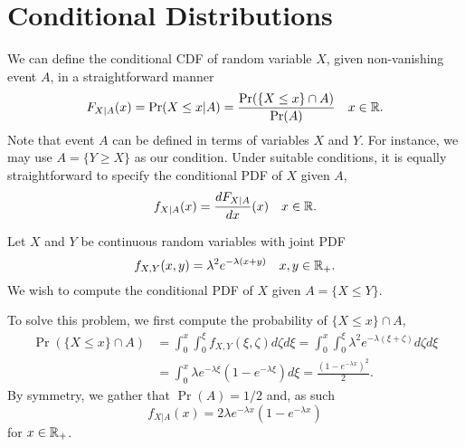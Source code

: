 \section{Conditional Distributions}

We can define the conditional CDF of random variable $X$, given non-vanishing event $A$, in a straightforward manner
\begin{equation*}
F_{X|A} (x) = \Pr (X \leq x | A)
= \frac{ \Pr ( \{ X \leq x \} \cap A ) }{\Pr(A)} \quad x \in \mathbb{R} .
\end{equation*}
Note that event $A$ can be defined in terms of variables $X$ and $Y$.
For instance, we may use $A = \{ Y \geq X \}$ as our condition.
Under suitable conditions, it is equally straightforward to specify the conditional PDF of $X$ given $A$,
\begin{equation*}
f_{X|A} (x) = \frac{d F_{X|A}}{dx} (x) \quad x \in \mathbb{R} .
\end{equation*}

\begin{example}
Let $X$ and $Y$ be continuous random variables with joint PDF
\begin{equation*}
f_{X,Y} (x,y) = \lambda^2 e^{-\lambda (x + y)} \quad x,y \in \mathbb{R}_+ .
\end{equation*}
We wish to compute the conditional PDF of $X$ given $A = \{ X \leq Y \}$.

To solve this problem, we first compute the probability of $\{ X \leq x \} \cap A$,
\begin{equation*}
\begin{split}
\Pr ( \{ X \leq x \} \cap A )
&= \int_0^x \int_0^{\xi} f_{X,Y} (\xi, \zeta) d\zeta d\xi
= \int_0^x \int_0^{\xi} \lambda^2 e^{-\lambda (\xi + \zeta)} d\zeta d\xi \\
&= \int_0^x \lambda e^{- \lambda \xi} \left( 1 - e^{- \lambda \xi} \right) d\xi
= \frac{ \left( 1 - e^{-\lambda x} \right)^2 }{2} .
\end{split}
\end{equation*}
By symmetry, we gather that $\Pr(A) = 1/2$ and, as such
\begin{equation*}
f_{X | A} (x) = 2 \lambda e^{-\lambda x} \left( 1 - e^{-\lambda x} \right)
\end{equation*}
for $x \in \mathbb{R}_+$.
\end{example}

